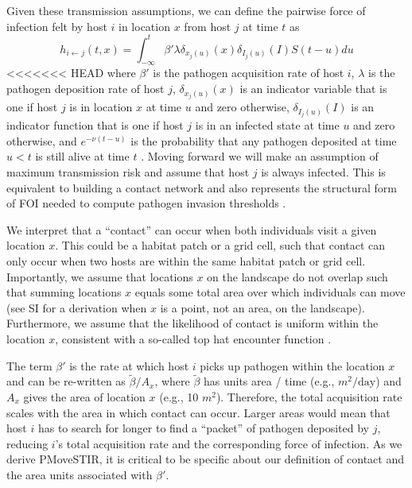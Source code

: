 \documentclass[letterpaper]{article}
\begin{document}
Given these transmission assumptions, we can define the pairwise force of infection felt by host $i$ in location $x$ from host $j$ at time $t$ as \citep{Wilber2022}
\begin{equation}
    h_{i \leftarrow j}(t, x) = \int_{-\infty}^{t} \beta' \lambda \delta_{x_j(u)}(x) \delta_{I_j(u)}(I) S(t - u) du
    \label{eq:original_foi}
\end{equation}
<<<<<<< HEAD
where $\beta'$ is the pathogen acquisition rate of host $i$, $\lambda$ is the pathogen deposition rate of host $j$, $\delta_{x_j(u)}(x)$ is an indicator variable that is one if host $j$ is in location $x$ at time $u$ and zero otherwise, $\delta_{I_j(u)}(I)$ is an indicator function that is one if host $j$ is in an infected state at time $u$ and zero otherwise, and $e^{-\nu(t - u)}$ is the probability that any pathogen deposited at time $u < t$ is still alive at time $t$ \citep[see][for a full derivation]{Wilber2022}.  
Moving forward we will make an assumption of maximum transmission risk and assume that host $j$ is always infected. 
This is equivalent to building a contact network and also represents the structural form of FOI needed to compute pathogen invasion thresholds \citep{Wilber2022}.

We interpret that a ``contact'' can occur when both individuals visit a given location $x$. This could be a habitat patch or a grid cell, such that contact can only occur when two hosts are within the same habitat patch or grid cell. 
Importantly, we assume that locations $x$ on the landscape do not overlap such that summing locations $x$ equals some total area over which individuals can move (see SI for a derivation when $x$ is a point, not an area, on the landscape). 
Furthermore, we assume that the likelihood of contact is uniform within the location $x$, consistent with a so-called top hat encounter function \citep{Gurarie2013,Wilber2022}.

The term $\beta'$ is the rate at which host $i$ picks up pathogen within the location $x$ and can be re-written as $\tilde{\beta} / A_x$, where $\tilde{\beta}$ has units area / time (e.g., $m^2 / \text{day}$) and $A_x$ gives the area of location $x$ (e.g., 10 $m^2$). 
Therefore, the total acquisition rate scales with the area in which contact can occur. Larger areas would mean that host $i$ has to search for longer to find a ``packet'' of pathogen deposited by $j$, reducing $i$'s total acquisition rate and the corresponding force of infection.
As we derive PMoveSTIR, it is critical to be specific about our definition of contact and the area units associated with $\beta'$.  
\end{document}
